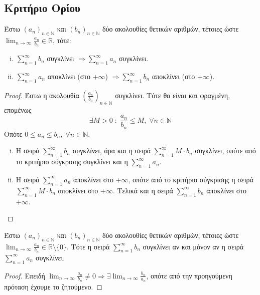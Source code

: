 \documentclass[main.tex]{subfiles}
\begin{document}
\subsection{Κριτήριο Ορίου}
\begin{thm}
    Έστω $ {(a_{n})}_{n \in \mathbb{N}} $ και $ {(b_{n})}_{n \in \mathbb{N}} $ δύο 
    ακολουθίες θετικών αριθμών, τέτοιες ώστε $ \lim_{n \to \infty} \frac{a_{n}}{b_{n}}
    \in \mathbb{R} $, τότε: 
    \begin{enumerate}[i)]
        \item $ \sum_{n=1}^{\infty} b_{n} $ συγκλίνει $ \Rightarrow 
            \sum_{n=1}^{\infty} a_{n} $ συγκλίνει.
        \item $ \sum_{n=1}^{\infty} a_{n} $ αποκλίνει (στο $+ \infty$) $ \Rightarrow 
        \sum_{n=1}^{\infty} b_{n} $ αποκλίνει (στο $+ \infty$).
    \end{enumerate}
\end{thm}
\begin{proof}
\item {}
    Έστω η ακολουθία $ {\left(\frac{a_{n}}{b_{n}}\right)}_{n \in \mathbb{N}} $ 
    συγκλίνει.  Τότε θα είναι και φραγμένη, επομένως
    \[
        \exists M>0 \; : \; \frac{a_{n}}{b_{n}} \leq M, \; \forall n \in \mathbb{N} 
     \] 
     Οπότε $ 0 \leq a_{n} \leq b_{n}, \; \forall n \in \mathbb{N} $.
     \begin{enumerate}[i)]
         \item Η σειρά $ \sum_{n=1}^{\infty} b_{n} $ συγκλίνει, άρα και η σειρά 
             $ \sum_{n=1}^{\infty} M\cdot b_{n} $ συγκλίνει, οπότε από το κριτήριο 
             σύγκρισης συγκλίνει και η $ \sum_{n=1}^{\infty} a_{n} $.
         \item Η σειρά $ \sum_{n=1}^{\infty} a_{n} $ αποκλίνει στο $ + \infty $, 
             οπότε από το κριτήριο σύγκρισης η σειρά 
             $ \sum_{n=1}^{\infty} M \cdot b_{n} $ αποκλίνει
             στο $ + \infty $. Τελικά και η σειρά $ \sum_{n=1}^{\infty} b_{n} $ 
             αποκλίνει στο $ + \infty $.
     \end{enumerate}
\end{proof}

\begin{cor}
    Έστω $ {(a_{n})}_{n \in \mathbb{N}} $ και $ {(b_{n})}_{n \in \mathbb{N}} $ δύο 
    ακολουθίες θετικών αριθμών, τέτοιες ώστε $ \lim_{n \to \infty} \frac{a_{n}}{b_{n}} 
    \in \mathbb{R} \setminus \{ 0 \}$. Τότε η σειρά $ \sum_{n=1}^{\infty} b_{n} $ 
    συγκλίνει αν και μόνον αν η σειρά $ \sum_{n=1}^{\infty} a_{n} $ συγκλίνει.
\end{cor}
\begin{proof}
    Επειδή $ \lim_{n \to \infty} \frac{a_{n}}{b_{n}} \neq 0 \Rightarrow \exists 
    \lim_{n \to \infty} \frac{b_{n}}{a_{n}}$, οπότε από την προηγούμενη πρόταση 
    έχουμε το ζητούμενο.
\end{proof}
\end{document}
